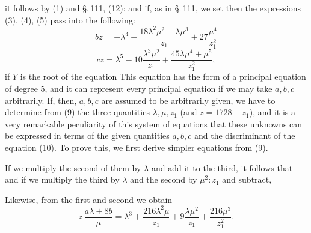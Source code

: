 
it follows by (1) and \S.\,111, (12):
and if, as in \S.\,111, we set
then the expressions (3), (4), (5) pass into the following:
\[
bz = -\lambda^4 + \frac{18\lambda^2\mu^2 + \lambda\mu^3}{z_1} + 27\frac{\mu^4}{z_1^2}
\]
\[
cz = \lambda^5 - 10\frac{\lambda^3\mu^2}{z_1} + \frac{45\lambda\mu^4 + \mu^5}{z_1^2},
\]
if $Y$ is the root of the equation
This equation has the form of a principal equation of degree 5, and it can represent every principal equation if we may take $a, b, c$ arbitrarily. If, then, $a, b, c$ are assumed to be arbitrarily given, we have to determine from (9) the three quantities $\lambda, \mu, z_1$ (and $z = 1728 - z_1$), and it is a very remarkable peculiarity of this system of equations that these unknowns can be expressed  in terms of the given quantities $a, b, c$ and the discriminant of the equation (10). To prove this, we first derive simpler equations from (9).

If we multiply the second of them by $\lambda$ and add it to the third, it follows that
and if we multiply the third by $\lambda$ and the second by $\mu^2 : z_1$ and subtract,

Likewise, from the first and second we obtain
\[
z\,\frac{a\lambda + 8b}{\mu} = \lambda^3 + \frac{216\lambda^2\mu}{z_1} + 9\frac{\lambda\mu^2}{z_1} + \frac{216\mu^3}{z_1^2}.
\]
